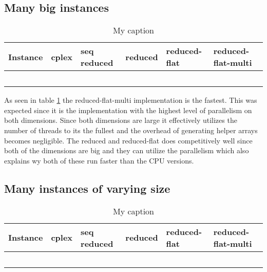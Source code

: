 \subsection{Many big instances}
\begin{table}[H]
	\centering
	\label{table:many_big_instances}
	\begin{tabular}{|l|l|l|l|l|l|}\hline
		Instance & cplex & seq reduced & reduced & reduced-flat & reduced-flat-multi \\\hline
		&       &             &         &              &                    \\\hline
		&       &             &         &              &                    \\\hline
		&       &             &         &              &                   \\\hline
		&       &             &         &              &                   \\\hline
		&       &             &         &              &                   \\\hline
	\end{tabular}
	\caption{My caption}
\end{table}


As seen in table \ref{table:many_big_instances} the reduced-flat-multi implementation is the fastest. This was expected since it is the implementation with the highest level of parallelism on both dimensions. Since both dimensions are large it effectively utilizes the number of threads to its the fullest and the overhead of generating helper arrays becomes negligible. The reduced and reduced-flat does competitively well since both of the dimensions are big and they can utilize the parallelism which also explains wy both of these run faster than the CPU versions.

\subsection{Many instances of varying size}
\begin{table}[H]
	\centering
	\label{table:many_varying_instances}
	\begin{tabular}{|l|l|l|l|l|l|}\hline
		Instance & cplex & seq reduced & reduced & reduced-flat & reduced-flat-multi \\\hline
		&       &             &         &              &                    \\\hline
		&       &             &         &              &                    \\\hline
		&       &             &         &              &                   \\\hline
		&       &             &         &              &                   \\\hline
		&       &             &         &              &                   \\\hline
	\end{tabular}
	\caption{My caption}
\end{table}

